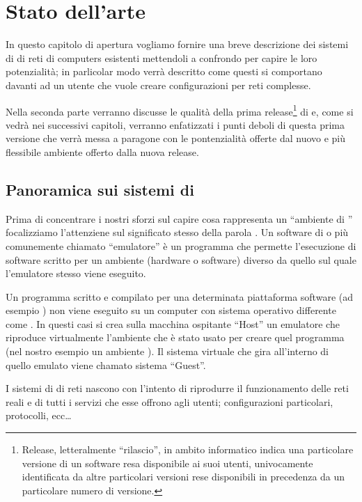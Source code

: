 \chapter{Stato dell'arte}\label{capitolo:arte}

In questo capitolo di apertura vogliamo fornire una breve descrizione dei sistemi di \emulazione{} di reti di computers esistenti mettendoli a confrondo per capire le loro potenzialità; in parlicolar modo verrà descritto come questi si comportano davanti ad un utente che vuole creare configurazioni per reti complesse.

Nella seconda parte verranno discusse le qualità della prima release\footnote{Release, letteralmente ``rilascio'', in ambito informatico indica una particolare versione di un software resa disponibile ai suoi utenti, univocamente identificata da altre particolari versioni rese disponibili in precedenza da un particolare numero di versione.} di \visualnetkit{} e, come si vedrà nei successivi capitoli, verranno enfatizzati i punti deboli di questa prima versione che verrà messa a paragone con le pontenzialità offerte dal nuovo e più flessibile ambiente offerto dalla nuova release.

\section{Panoramica sui sistemi di \emulazione{}}
Prima di concentrare i nostri sforzi sul capire cosa rappresenta un ``ambiente di \emulazione{}'' focalizziamo l'attenziene sul significato stesso della parola \emulazione{}. Un software di \emulazione{} o più comunemente chiamato ``emulatore'' è un programma che permette l'esecuzione di software scritto per un ambiente (hardware o software) diverso da quello sul quale l'emulatore stesso viene eseguito.

Un programma scritto e compilato per una determinata piattaforma software (ad esempio \windows) non viene eseguito su un computer con sistema operativo differente come \linux{}. In questi casi si crea sulla macchina ospitante ``Host'' un emulatore che riproduce virtualmente l'ambiente che è stato usato per creare quel programma (nel nostro esempio un ambiente \windows{}). Il sistema virtuale che gira all'interno di quello emulato viene chamato sistema ``Guest''.

I sistemi di \emulazione{} di reti nascono con l'intento di riprodurre il funzionamento delle reti reali e di tutti i servizi che esse offrono agli utenti; configurazioni particolari, protocolli, ecc\ldots

